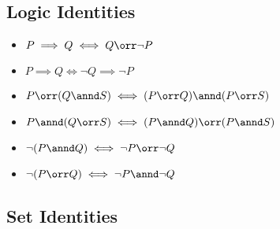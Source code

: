 \hypertarget{logic-identities}{%
\subsection{Logic Identities}\label{logic-identities}}

\begin{itemize}
\tightlist
\item
  \(P \implies Q \iff Q \orr \lnot P\)
\item
  \(P \implies Q \iff \lnot Q \implies \lnot P\)
\item
  \(P \orr(Q \annd S) \iff (P \orr Q) \annd (P \orr S)\)
\item
  \(P \annd(Q \orr S) \iff (P \annd Q) \orr (P \annd S)\)
\item
  \(\lnot (P \annd Q) \iff \lnot P \orr \lnot Q\)
\item
  \(\lnot (P \orr Q) \iff \lnot P \annd \lnot Q\)
\end{itemize}

\hypertarget{set-identities}{%
\subsection{Set Identities}\label{set-identities}}

